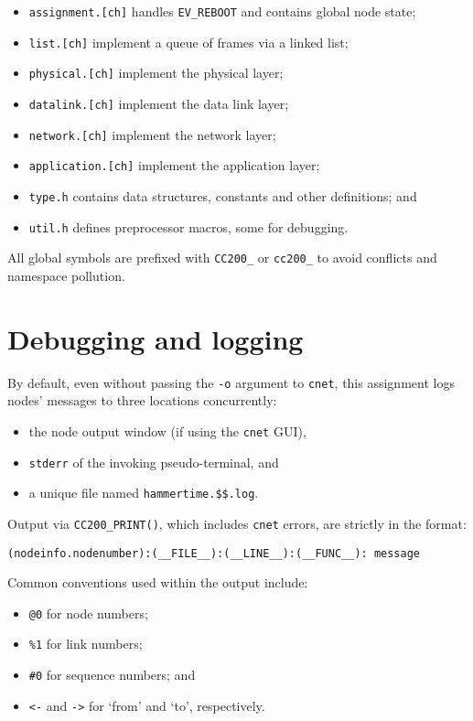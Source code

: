 \documentclass[a4paper,12pt,titlepage]{article}
\begin{document}
\begin{itemize}
	\item \texttt{assignment.[ch]} handles \texttt{EV\_REBOOT} and contains
	      global node state;
	\item \texttt{list.[ch]} implement a queue of frames via a linked list;
	\item \texttt{physical.[ch]} implement the physical layer;
	\item \texttt{datalink.[ch]} implement the data link layer;
	\item \texttt{network.[ch]} implement the network layer;
	\item \texttt{application.[ch]} implement the application layer;
	\item \texttt{type.h} contains data structures, constants and other
	      definitions; and
	\item \texttt{util.h} defines preprocessor macros, some for debugging.
\end{itemize}

All global symbols are prefixed with \texttt{CC200\_} or \texttt{cc200\_} to
avoid conflicts and namespace pollution.

\section{Debugging and logging}

By default, even without passing the \texttt{-o} argument to \texttt{cnet},
this assignment logs nodes' messages to three locations concurrently:

\begin{itemize}
	\item the node output window (if using the \texttt{cnet} GUI),
	\item \texttt{stderr} of the invoking pseudo-terminal, and
	\item a unique file named \texttt{hammertime.\$\$.log}.
\end{itemize}

Output via \texttt{CC200\_PRINT()}, which includes \texttt{cnet} errors, are
strictly in the format:

\begin{lstlisting}
(nodeinfo.nodenumber):(__FILE__):(__LINE__):(__FUNC__): message
\end{lstlisting}

Common conventions used within the output include:

\begin{itemize}
	\item \texttt{@0} for node numbers;
	\item \texttt{\%1} for link numbers;
	\item \texttt{\#0} for sequence numbers; and
	\item \texttt{<-} and \texttt{->} for `from' and `to', respectively.
\end{itemize}
\end{document}
